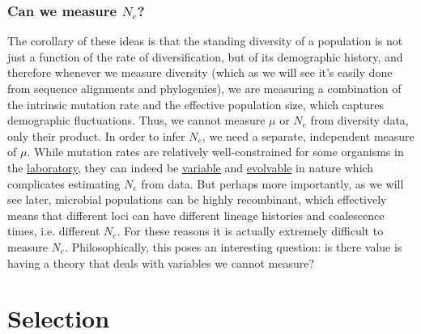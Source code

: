 \documentclass[10pt,a4paper]{scrbook}
\begin{document}
\subsubsection{Can we measure $N_e$?}
The corollary of these ideas is that the standing diversity of a population is not just a function of the rate of diversification, but of its demographic history, and therefore whenever we measure diversity (which as we will see it's easily done from sequence alignments and phylogenies), we are measuring a combination of the intrinsic mutation rate and the effective population size, which captures demographic fluctuations. Thus, we cannot measure \( \mu \) or \( N_e \) from diversity data, only their product. In order to infer \( N_e \), we need a separate, independent measure of \( \mu \). While mutation rates are relatively well-constrained for some organisms in the \href{https://pmc.ncbi.nlm.nih.gov/articles/PMC2932672/}{laboratory}, they can indeed be \href{https://journals.plos.org/plosbiology/article?id=10.1371/journal.pbio.3000617}{variable} and \href{https://onlinelibrary.wiley.com/doi/10.1111/j.1365-2958.2006.05150.x}{evolvable} in nature which complicates estimating $N_e$ from data. But perhaps more importantly, as we will see later, microbial populations can be highly recombinant, which effectively means that different loci can have different lineage histories and coalescence times, i.e. different $N_e$. For these reasons it is actually extremely difficult to measure $N_e$. Philosophically, this poses an interesting question: is there value is having a theory that deals with variables we cannot measure?

\section{Selection}
\end{document}
